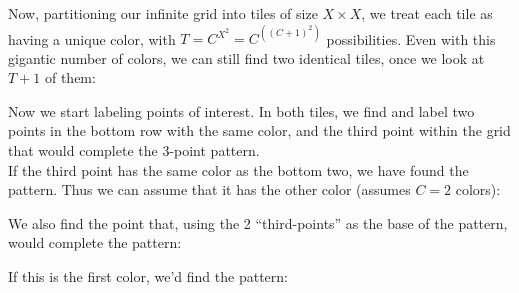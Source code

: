 \documentclass[11pt]{article}
\edef\getxnow(#1,#2){#1}
\edef\getynow(#1,#2){#2}
\newcommand*{\getx}[1]{\expandafter\getxnow#1}
\newcommand*{\gety}[1]{\expandafter\getynow#1}
\newcommand*{\scalePic}{0.4}
\newcommand*{\gridArg}[7]{%
    \foreach \x in {\fpeval{#1},\fpeval{#1+#2},...,\fpeval{#3+0.0001}} %
        \draw [black, thin, #7] (\x,\fpeval{#4}) -- (\x,\fpeval{#6+0.0001});
    \foreach \y in {\fpeval{#4},\fpeval{#4+#5},...,\fpeval{#6+0.0001}}
        \draw [black, thin, #7] (\fpeval{#1},\y) -- (\fpeval{#3+0.0001},\y);
}
\newcommand*{\grid}[6]{\gridArg{#1}{#2}{#3}{#4}{#5}{#6}{}}%
\newcommand*{\mybigbox}[4]{\grid{#1}{#3}{#1+#3}{#2}{#4}{#2+#4}} %
\newcommand*{\mybox}[2]{\mybigbox{#1}{#2}{1}{1}} %
\newcommand*{\myboxes}[1]{\foreach \pt in {#1} {\mybox{\getx{\pt}}{\gety{\pt}}}}
\begin{document}
Now, partitioning our infinite grid into tiles of size $X \times X$, we treat each tile as having a unique color, with $T = C^{X^2} = C^{\left((C+1)^2\right)}$ possibilities. Even with this gigantic number of colors, we can still find two identical tiles, once we look at $T+1$ of them:

\begin{center}
\end{center}

Now we start labeling points of interest. In both tiles, we find and label two points in the bottom row with the same color, and the third point within the grid that would complete the 3-point pattern.\\
If the third point has the same color as the bottom two, we have found the pattern. Thus we can assume that it has the other color (assumes $C=2$ colors):

\begin{center}
\end{center}

We also find the point that, using the 2 ``third-points'' as the base of the pattern, would complete the pattern:
\begin{center}
\end{center}

If this is the first color, we'd find the pattern:
\begin{center}
\end{center}
\end{document}

